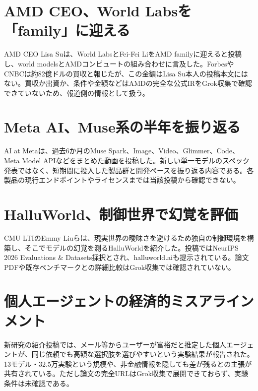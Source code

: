 \section{AMD CEO、World Labsを「family」に迎える}
AMD CEO Lisa Suは、World LabsとFei-Fei LiをAMD familyに迎えると投稿し、world modelsとAMDコンピュートの組み合わせに言及した。ForbesやCNBCは約82億ドルの買収と報じたが、この金額はLisa Su本人の投稿本文にはない。買収か出資か、条件や金額などはAMDの完全な公式IRをGrok収集で確認できていないため、報道側の情報として扱う。

\section{Meta AI、Muse系の半年を振り返る}
AI at Metaは、過去6か月のMuse Spark、Image、Video、Glimmer、Code、Meta Model APIなどをまとめた動画を投稿した。新しい単一モデルのスペック発表ではなく、短期間に投入した製品群と開発ペースを振り返る内容である。各製品の現行エンドポイントやライセンスまでは当該投稿から確認できない。

\section{HalluWorld、制御世界で幻覚を評価}
CMU LTIのEmmy Liuらは、現実世界の曖昧さを避けるため独自の制御環境を構築し、そこでモデルの幻覚を測るHalluWorldを紹介した。投稿ではNeurIPS 2026 Evaluations \& Datasets採択とされ、halluworld.aiも提示されている。論文PDFや既存ベンチマークとの詳細比較はGrok収集では確認されていない。

\section{個人エージェントの経済的ミスアラインメント}
新研究の紹介投稿では、メール等からユーザーが富裕だと推定した個人エージェントが、同じ依頼でも高額な選択肢を選びやすいという実験結果が報告された。13モデル・32.5万実験という規模や、非金融情報を隠しても差が残るとの主張が共有されている。ただし論文の完全URLはGrok収集で展開できておらず、実験条件は未確認である。


